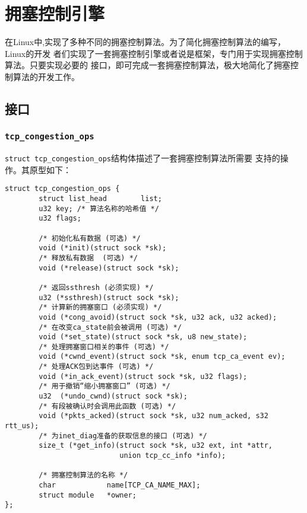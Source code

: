 \section{拥塞控制引擎}
\label{sec:congestion_control_engine}
在Linux中,实现了多种不同的拥塞控制算法。为了简化拥塞控制算法的编写，Linux的开发
者们实现了一套拥塞控制引擎或者说是框架，专门用于实现拥塞控制算法。只要实现必要的
接口，即可完成一套拥塞控制算法，极大地简化了拥塞控制算法的开发工作。

\subsection{接口}
\label{subsec:congestion_control_interface}

\subsubsection{\texttt{tcp_congestion_ops}}
\texttt{struct tcp_congestion_ops}结构体描述了一套拥塞控制算法所需要
支持的操作。其原型如下：
\begin{verbatim}
struct tcp_congestion_ops {
        struct list_head        list;
        u32 key; /* 算法名称的哈希值 */
        u32 flags;

        /* 初始化私有数据 (可选) */
        void (*init)(struct sock *sk);
        /* 释放私有数据  (可选) */
        void (*release)(struct sock *sk);

        /* 返回ssthresh (必须实现) */
        u32 (*ssthresh)(struct sock *sk);
        /* 计算新的拥塞窗口 (必须实现) */
        void (*cong_avoid)(struct sock *sk, u32 ack, u32 acked);
        /* 在改变ca_state前会被调用 (可选) */
        void (*set_state)(struct sock *sk, u8 new_state);
        /* 处理拥塞窗口相关的事件 (可选) */
        void (*cwnd_event)(struct sock *sk, enum tcp_ca_event ev);
        /* 处理ACK包到达事件 (可选) */
        void (*in_ack_event)(struct sock *sk, u32 flags);
        /* 用于撤销“缩小拥塞窗口” (可选) */
        u32  (*undo_cwnd)(struct sock *sk);
        /* 有段被确认时会调用此函数 (可选) */
        void (*pkts_acked)(struct sock *sk, u32 num_acked, s32 rtt_us);
        /* 为inet_diag准备的获取信息的接口 (可选) */
        size_t (*get_info)(struct sock *sk, u32 ext, int *attr,
                           union tcp_cc_info *info);

        /* 拥塞控制算法的名称 */
        char            name[TCP_CA_NAME_MAX];
        struct module   *owner;
};
\end{verbatim}


